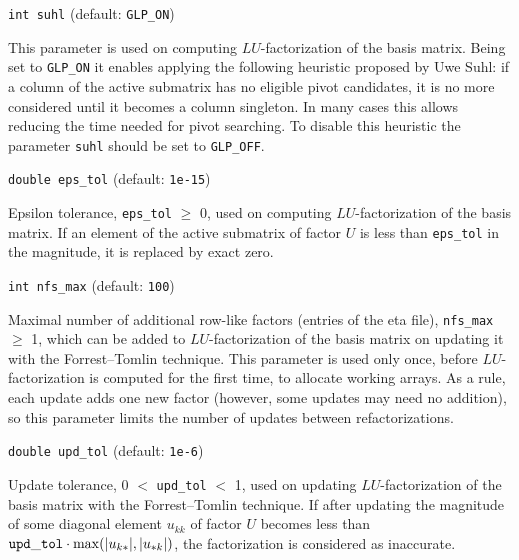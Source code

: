 \medskip

{\tt int suhl} (default: {\tt GLP\_ON})

This parameter is used on computing $LU$-factorization of the basis
matrix. Being set to {\tt GLP\_ON} it enables applying the following
heuristic proposed by Uwe Suhl: if a column of the active submatrix has
no eligible pivot candidates, it is no more considered until it becomes
a column singleton. In many cases this allows reducing the time needed
for pivot searching. To disable this heuristic the parameter
\verb|suhl| should be set to {\tt GLP\_OFF}.

\medskip

{\tt double eps\_tol} (default: {\tt 1e-15})

Epsilon tolerance, \verb|eps_tol| $\geq$ 0, used on computing
$LU$-factorization of the basis matrix. If an element of the active
submatrix of factor $U$ is less than \verb|eps_tol| in the magnitude,
it is replaced by exact zero.

%
%

\medskip

{\tt int nfs\_max} (default: {\tt 100})

Maximal number of additional row-like factors (entries of the eta
file), \verb|nfs_max| $\geq$ 1, which can be added to
$LU$-factorization of the basis matrix on updating it with the
Forrest--Tomlin technique. This parameter is used only once, before
$LU$-factorization is computed for the first time, to allocate working
arrays. As a rule, each update adds one new factor (however, some
updates may need no addition), so this parameter limits the number of
updates between refactorizations.

\medskip

{\tt double upd\_tol} (default: {\tt 1e-6})

Update tolerance, 0 $<$ \verb|upd_tol| $<$ 1, used on updating
$LU$-factorization of the basis matrix with the Forrest--Tomlin
technique. If after updating the magnitude of some diagonal element
$u_{kk}$ of factor $U$ becomes less than
${\tt upd\_tol}\cdot\max(|u_{k*}|, |u_{*k}|)$, the factorization is
considered as inaccurate.

